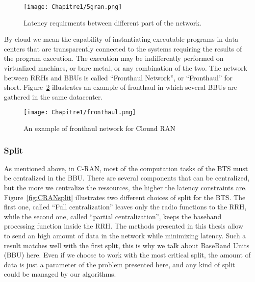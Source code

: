 \begin{figure}[h]
      \begin{center}
      \texttt{[image: Chapitre1/5gran.png]}
      \end{center}
      \caption{Latency requirments between different part of the network.}\label{fig:5gran}
      \end{figure}

By cloud we mean the capability of instantiating executable programs in data centers that are transparently connected to the systems requiring the results of the program execution.
 The execution may be indifferently performed on virtualized machines, or bare metal, or any combination of the two. The network between RRHs and BBUs is called “Fronthaul Network”, or “Fronthaul” for short. Figure~\ref{fig:fronthaul} illustrates an example of fronthaul in which several BBUs are gathered in the same datacenter. 

  \begin{figure}[h]
      \begin{center}
      \texttt{[image: Chapitre1/fronthaul.png]}
      \end{center}
      \caption{An example of fronthaul network for Clound RAN}\label{fig:fronthaul}
      \end{figure}
      
      \subsubsection{Split}

      As mentioned above, in C-RAN, most of the computation tasks of the BTS must be centralized in the BBU. There are several components that can be centralized, but the more we centralize the ressources, the higher the latency constraints are.
      Figure~\ref{fig:CRANsplit} illustrates two different choices of split for the BTS. The first one, called ``Full centralization'' leaves only the radio functions to the RRH, while the second one, called ``partial centralization'', keeps the baseband processing function inside the RRH. The methods presented in this thesis allow to send an high amount of data in the network while minimizing latency. Such a result matches well with the first split, this is why we talk about BaseBand Units (BBU) here. Even if we choose to work with the most critical split, the amount of data is just a parameter of the problem presented here, and any kind of split could be managed by our algorithms.
      
